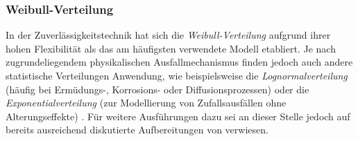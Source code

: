 \subsubsection{Weibull-Verteilung} \label{subsubsec:weibull}
In der Zu\-ver\-läs\-sig\-keits\-tech\-nik hat sich die \textit{Wei\-bull-Ver\-teil\-ung} auf\-grund ihrer hohen Flexi\-bi\-li\-tät als das am häufigsten verwendete Modell etabliert.
Je nach zugrundeliegendem physikalischen Ausfallmechanismus finden jedoch auch andere statistische Verteilungen Anwendung, wie beispielsweise die \textit{Lognormalverteilung} (häufig bei Ermüdungs-, Korrosions- oder Diffusionsprozessen) oder die \textit{Exponentialverteilung} (zur Modellierung von Zufallsausfällen ohne Alterungseffekte)  \cite{Yang.2007,Birolini.2017}.
Für weitere Ausführungen dazu sei an dieser Stelle jedoch auf bereits ausreichend diskutierte Aufbereitungen von \textcite{Bertsche.2022,Birolini.2017,Yang.2007,Hedderich.2020,Rigdon.2022} verwiesen.

